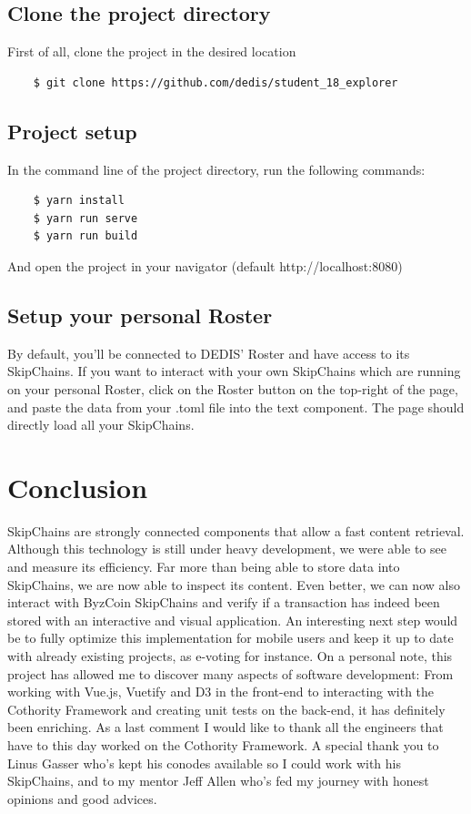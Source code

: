 \documentclass[11pt, a4paper, twoside, openright]{article} %
\begin{document}
{\subsection{Clone the project directory}
First of all, clone the project in the desired location
\begin{lstlisting}
    $ git clone https://github.com/dedis/student_18_explorer
\end{lstlisting}
\subsection{Project setup}
In the command line of the project directory, run the following commands:
\begin{lstlisting}
    $ yarn install
    $ yarn run serve
    $ yarn run build
\end{lstlisting}
And open the project in your navigator (default http://localhost:8080)
\subsection{Setup your personal Roster}
By default, you'll be connected to DEDIS' Roster and have access to its SkipChains. If you want to interact with your own SkipChains which are running on your personal Roster, click on the Roster button on the top-right of the page, and paste the data from your .toml file into the text component. The page should directly load all your SkipChains. 
\section{Conclusion}
SkipChains are strongly connected components that allow a fast content retrieval. Although this technology is still under heavy development, we were able to see and measure its efficiency.
Far more than being able to store data into SkipChains, we are now able to inspect its content. Even better, we can now also interact with ByzCoin SkipChains and verify if a transaction has indeed been stored with an interactive and visual application.
An interesting next step would be to fully optimize this implementation for mobile users and keep it up to date with already existing projects, as e-voting for instance. On a personal note, this project has allowed me to discover many aspects of software development: From working with Vue.js, Vuetify and D3 in the front-end to interacting with the Cothority Framework and creating unit tests on the back-end, it has definitely been enriching. As a last comment I would like to thank all the engineers that have to this day worked on the Cothority Framework. A special thank you to Linus Gasser who's kept his conodes available so I could work with his SkipChains, and to my mentor Jeff Allen who's fed my journey with honest opinions and good advices. 
\newpage
\begin{thebibliography}{9}


\end{thebibliography}}
\end{document}
